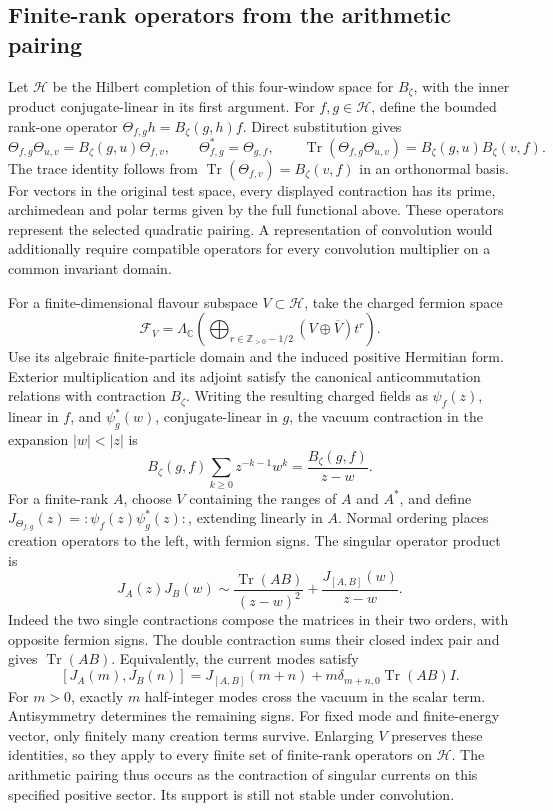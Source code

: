 \subsection{Finite-rank operators from the arithmetic pairing}

Let $\mathscr H$ be the Hilbert completion of this four-window space for
$B_\zeta$, with the inner product conjugate-linear in its first argument.
For $f,g\in\mathscr H$, define the bounded rank-one operator
$\Theta_{f,g}h=B_\zeta(g,h)f$. Direct substitution gives
\[
 \Theta_{f,g}\Theta_{u,v}=B_\zeta(g,u)\Theta_{f,v},\qquad
 \Theta_{f,g}^*=\Theta_{g,f},\qquad
 \operatorname{Tr}(\Theta_{f,g}\Theta_{u,v})
 =B_\zeta(g,u)B_\zeta(v,f).
\]
The trace identity follows from
$\operatorname{Tr}(\Theta_{f,v})=B_\zeta(v,f)$ in an orthonormal basis.
For vectors in the original test space, every displayed contraction has
its prime, archimedean and polar terms given by the full functional above.
These operators represent the selected quadratic pairing. A representation
of convolution would additionally require compatible operators for every
convolution multiplier on a common invariant domain.


For a finite-dimensional flavour subspace $V\subset\mathscr H$, take the
charged fermion space
\[
 \mathcal F_V=\Lambda_{\mathbb C}\!\left(
 \bigoplus_{r\in\mathbb Z_{>0}-1/2}(V\oplus\overline V)t^r\right).
\]
Use its algebraic finite-particle domain and the induced positive Hermitian form.
Exterior multiplication and its adjoint satisfy the canonical
anticommutation relations with contraction $B_\zeta$.
Writing the resulting charged fields as $\psi_f(z)$, linear in $f$,
and $\psi_g^*(w)$, conjugate-linear in $g$,
the vacuum contraction in the expansion $|w|<|z|$ is
\[
 B_\zeta(g,f)\sum_{k\ge0}z^{-k-1}w^k
 =\frac{B_\zeta(g,f)}{z-w}.
\]
For a finite-rank $A$, choose $V$ containing the ranges of $A$ and $A^*$,
and define $J_{\Theta_{f,g}}(z)=:\psi_f(z)\psi_g^*(z):$, extending linearly in $A$.
Normal ordering places creation operators to the left, with fermion signs.
The singular operator product is
\[
 J_A(z)J_B(w)\sim
 \frac{\operatorname{Tr}(AB)}{(z-w)^2}
 +\frac{J_{[A,B]}(w)}{z-w}.
\]
Indeed the two single contractions compose the matrices in their two
orders, with opposite fermion signs. The double contraction sums their
closed index pair and gives $\operatorname{Tr}(AB)$.
Equivalently, the current modes satisfy
\[
 [J_A(m),J_B(n)]=J_{[A,B]}(m+n)
 +m\delta_{m+n,0}\operatorname{Tr}(AB)I.
\]
For $m>0$, exactly $m$ half-integer modes cross the vacuum in the scalar
term. Antisymmetry determines the remaining signs.
For fixed mode and finite-energy vector, only finitely many creation
terms survive. Enlarging $V$ preserves these identities, so they apply
to every finite set of finite-rank operators on $\mathscr H$.
The arithmetic pairing thus occurs as the contraction of singular
currents on this specified positive sector. Its support is still not
stable under convolution.
